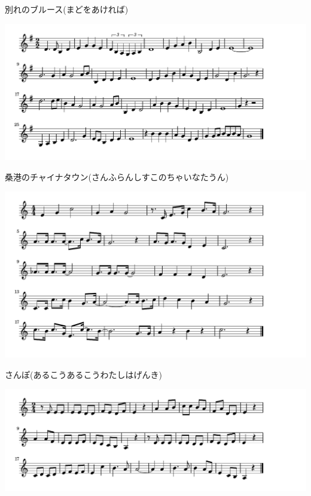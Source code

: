 \documentclass[a4paper]{ltjsarticle}
\begin{document}
\vspace{-10mm} \hspace{10mm}
別れのブルース(まどをあければ)

\includegraphics[clip]{chinatown_crop.pdf}

\vspace{-10mm} \hspace{10mm}
桑港のチャイナタウン(さんふらんしすこのちゃいなたうん)

\includegraphics[clip]{sanpo_crop.pdf}

\vspace{-10mm} \hspace{10mm}
さんぽ(あるこうあるこうわたしはげんき)

\includegraphics[clip]{morinokobito_crop.pdf}
\end{document}
